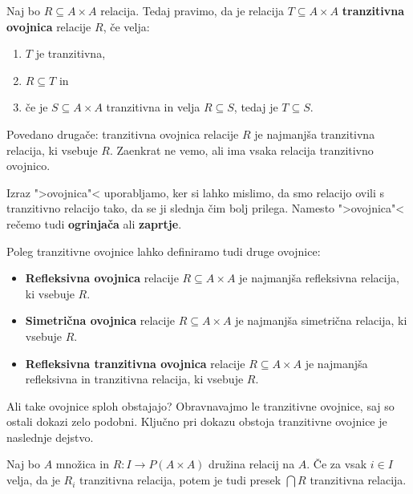 \begin{definicija}
  Naj bo $R \subseteq A \times A$ relacija. Tedaj pravimo, da je relacija $T \subseteq A \times A$ \textbf{tranzitivna ovojnica} relacije $R$, če velja:
  \begin{enumerate}
  \item $T$ je tranzitivna,
  \item $R \subseteq T$ in
  \item če je $S \subseteq A \times A$ tranzitivna in velja $R \subseteq S$, tedaj je $T \subseteq S$.
  \end{enumerate}
\end{definicija}

Povedano drugače: tranzitivna ovojnica relacije $R$ je \textsf{najmanjša} tranzitivna
relacija, ki vsebuje $R$. Zaenkrat ne vemo, ali ima vsaka relacija tranzitivno
ovojnico.

Izraz ">ovojnica"< uporabljamo, ker si lahko mislimo, da smo relacijo ovili
s tranzitivno relacijo tako, da se ji slednja čim bolj prilega. Namesto ">ovojnica"<
rečemo tudi \textbf{ogrinjača} ali \textbf{zaprtje}.

Poleg tranzitivne ovojnice lahko definiramo tudi druge ovojnice:
%
\begin{itemize}
  \item \textbf{Refleksivna ovojnica} relacije $R \subseteq A \times A$ je najmanjša refleksivna relacija, ki vsebuje $R$.
  \item \textbf{Simetrična ovojnica} relacije $R \subseteq A \times A$ je najmanjša simetrična relacija, ki vsebuje $R$.
  \item \textbf{Refleksivna tranzitivna ovojnica} relacije $R \subseteq A \times A$ je najmanjša refleksivna in tranzitivna relacija, ki vsebuje $R$.
\end{itemize}
%
Ali take ovojnice sploh obstajajo? Obravnavajmo le tranzitivne ovojnice, saj so
ostali dokazi zelo podobni. Ključno pri dokazu obstoja tranzitivne ovojnice je
naslednje dejstvo.

\begin{lema}
  Naj bo $A$ množica in $R : I \to P(A \times A)$ družina relacij na $A$. Če za
  vsak $i \in I$ velja, da je $R_i$ tranzitivna relacija, potem je tudi presek $\bigcap R$ tranzitivna relacija.
\end{lema}

